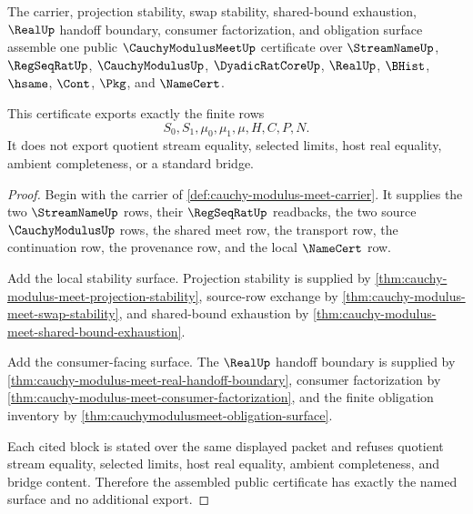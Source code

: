 \begin{theorem}
\label{thm:cauchy-modulus-meet-public-export}
The carrier, projection stability, swap stability, shared-bound exhaustion, $\RealUp$ handoff boundary, consumer factorization, and obligation surface assemble one public $\CauchyModulusMeetUp$ certificate over $\StreamNameUp$, $\RegSeqRatUp$, $\CauchyModulusUp$, $\DyadicRatCoreUp$, $\RealUp$, $\BHist$, $\hsame$, $\Cont$, $\Pkg$, and $\NameCert$.

This certificate exports exactly the finite rows
$$
S_0,S_1,\mu_0,\mu_1,\mu,H,C,P,N.
$$
It does not export quotient stream equality, selected limits, host real equality, ambient completeness, or a standard bridge.
\end{theorem}
\begin{proof}
Begin with the carrier of \autoref{def:cauchy-modulus-meet-carrier}. It supplies the two $\StreamNameUp$ rows, their $\RegSeqRatUp$ readbacks, the two source $\CauchyModulusUp$ rows, the shared meet row, the transport row, the continuation row, the provenance row, and the local $\NameCert$ row.

Add the local stability surface. Projection stability is supplied by \autoref{thm:cauchy-modulus-meet-projection-stability}, source-row exchange by \autoref{thm:cauchy-modulus-meet-swap-stability}, and shared-bound exhaustion by \autoref{thm:cauchy-modulus-meet-shared-bound-exhaustion}.

Add the consumer-facing surface. The $\RealUp$ handoff boundary is supplied by \autoref{thm:cauchy-modulus-meet-real-handoff-boundary}, consumer factorization by \autoref{thm:cauchy-modulus-meet-consumer-factorization}, and the finite obligation inventory by \autoref{thm:cauchymodulusmeet-obligation-surface}.

Each cited block is stated over the same displayed packet and refuses quotient stream equality, selected limits, host real equality, ambient completeness, and bridge content. Therefore the assembled public certificate has exactly the named surface and no additional export.
\end{proof}

